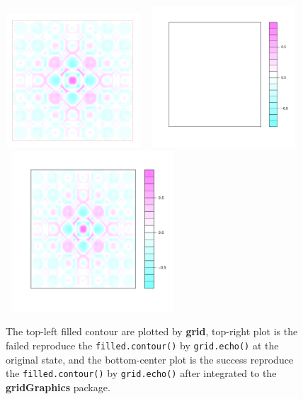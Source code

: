 \documentclass{report}
\begin{document}
\begin{figure}[h]
	\begin{center}
		\includegraphics[height = 5cm, width = 5cm]{figure/filledContour_origin_02.pdf}
		\includegraphics[height = 5.3cm, width = 6cm]{figure/filledContour_origin_03.pdf}
		\includegraphics[height = 6cm, width = 6.5cm]{figure/filledContour_origin_01.pdf}
		
		\caption{The top-left filled contour are plotted by \textbf{grid}, top-right plot is the failed reproduce the \texttt{filled.contour()} by \texttt{grid.echo()} at the original state, and the bottom-center plot is the success reproduce the \texttt{filled.contour()} by \texttt{grid.echo()} after integrated to the \textbf{gridGraphics} package.}
		\label{figure_4.6}
	\end{center}
\end{figure}
\end{document}
